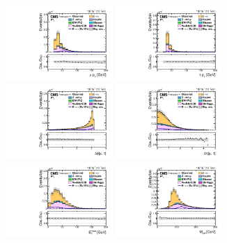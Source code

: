 \begin{figure}[htbp!]
  \centering
  \includegraphics[width=0.36\textwidth]{plots/chapter6/mutau/mPt.pdf}
  \includegraphics[width=0.36\textwidth]{plots/chapter6/mutau/tPt.pdf}\\
  \includegraphics[width=0.36\textwidth]{plots/chapter6/mutau/dPhiMuTau.pdf}
  \includegraphics[width=0.36\textwidth]{plots/chapter6/mutau/dEtaMuTau.pdf}\\
  \includegraphics[width=0.36\textwidth]{plots/chapter6/mutau/type1_pfMetEt.pdf}
  \includegraphics[width=0.36\textwidth]{plots/chapter6/mutau/m_t_CollinearMass.pdf}\\

\end{figure}
